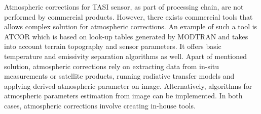 Atmospheric corrections for TASI sensor, as part of processing chain, are not performed by commercial products. However, there exists commercial tools that allows complex solution for atmospheric corrections. An example of such a tool is ATCOR \cite{RS02} which is based on look-up tables generated by MODTRAN and takes into account terrain topography and sensor parameters. It offers basic temperature and emissivity separation algorithms as well. Apart of mentioned solution, atmospheric corrections rely on extracting data from in-situ measurements or satellite products, running radiative transfer models and applying derived atmospheric parameter on image. Alternatively, algorithms for atmospheric parameters estimation from image can be implemented. In both cases, atmospheric corrections involve creating in-house tools.

